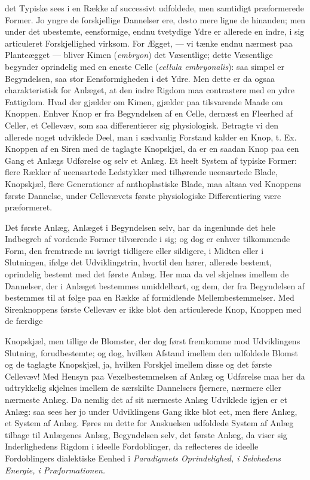 \documentclass[12pt,a4paper]{book}
\begin{document}
det Typiske sees i en Række af successivt udfoldede, men samtidigt
præformerede Former. Jo yngre de forskjellige Dannelser ere, desto mere
ligne de hinanden; men under det ubestemte, eensformige, endnu tvetydige
Ydre er allerede en indre, i sig articuleret Forskjellighed virksom. For
Ægget, --- vi tænke endnu nærmest paa Planteægget --- bliver Kimen
(\textit{embryon}) det Væsentlige; dette Væsentlige begynder oprindelig
med en eneste Celle (\textit{cellula embryonalis}): saa simpel er
Begyndelsen, saa stor Eensformigheden i det Ydre. Men dette er da ogsaa
charakteristisk for Anlæget, at den indre Rigdom maa contrastere med en
ydre Fattigdom. Hvad der gjælder om Kimen, gjælder paa tilsvarende Maade
om Knoppen. Enhver Knop er fra Begyndelsen af en Celle, dernæst en
Fleerhed af Celler, et Cellevæv, som saa differentierer sig physiologisk.
Betragte vi den allerede noget udviklede Deel, man i sædvanlig Forstand
kalder en Knop, t. Ex. Knoppen af en Siren med de taglagte Knopskjæl, da
er en saadan Knop paa een Gang et Anlægs Udførelse og selv et Anlæg. Et
heelt System af typiske Former: flere Rækker af ueensartede Ledstykker
med tilhørende ueensartede Blade, Knopskjæl, flere Generationer af
anthoplastiske Blade, maa altsaa ved Knoppens første Dannelse, under
Cellevævets første physiologiske Differentiering være præformeret.

Det første Anlæg, Anlæget i Begyndelsen selv, har da ingenlunde det hele
Indbegreb af vordende Former tilværende i sig; og dog er enhver
tilkommende Form, den fremtræde nu iøvrigt tidligere eller sildigere, i
Midten eller i Slutningen, ifølge det Udviklingstrin, hvortil den hører,
allerede bestemt, oprindelig bestemt med det første Anlæg. Her maa da vel
skjelnes imellem de Dannelser, der i Anlæget bestemmes umiddelbart, og
dem, der fra Begyndelsen af bestemmes til at følge paa en Række af
formidlende Mellembestemmelser. Med Sirenknoppens første Cellevæv er ikke
blot den articulerede Knop, Knoppen med de færdige

\setcounter{footnote}{0}
Knopskjæl, men tillige de Blomster, der dog først fremkomme mod
Udviklingens Slutning, forudbestemte; og dog, hvilken Afstand imellem den
udfoldede Blomst og de taglagte Knopskjæl, ja, hvilken Forskjel imellem
disse og det første Cellevæv! Med Hensyn paa Vexelbestemmelsen af Anlæg
og Udførelse maa her da udtrykkelig skjelnes imellem de særskilte
Dannelsers fjernere, nærmere eller nærmeste Anlæg. Da nemlig det af sit
nærmeste Anlæg Udviklede igjen er et Anlæg: saa sees her jo under
Udviklingens Gang ikke blot eet, men flere Anlæg, et System af Anlæg.
Føres nu dette for Anskuelsen udfoldede System af Anlæg tilbage til
Anlægenes Anlæg, Begyndelsen selv, det første Anlæg, da viser sig
Inderlighedens Rigdom i ideelle Fordoblinger, da reflecteres de ideelle
Fordoblingers dialektiske Eenhed i \emph{Paradigmets Oprindelighed, i
Selvhedens Energie, i Præformationen.}
\end{document}
